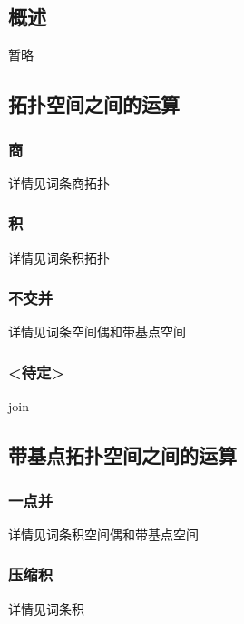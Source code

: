 
\begin{issues}
\issueDraft
\issueTODO
\issueMissDepend
\issueAbstract
\issueNeedCite
\end{issues}

\subsection{概述}

暂略

\subsection{拓扑空间之间的运算}

\subsubsection{商}

详情见词条商拓扑


\subsubsection{积}

详情见词条积拓扑


\subsubsection{不交并}

详情见词条空间偶和带基点空间


\subsubsection{<待定>}

join


\subsection{带基点拓扑空间之间的运算}



\subsubsection{一点并}

详情见词条积空间偶和带基点空间


\subsubsection{压缩积}

详情见词条积




